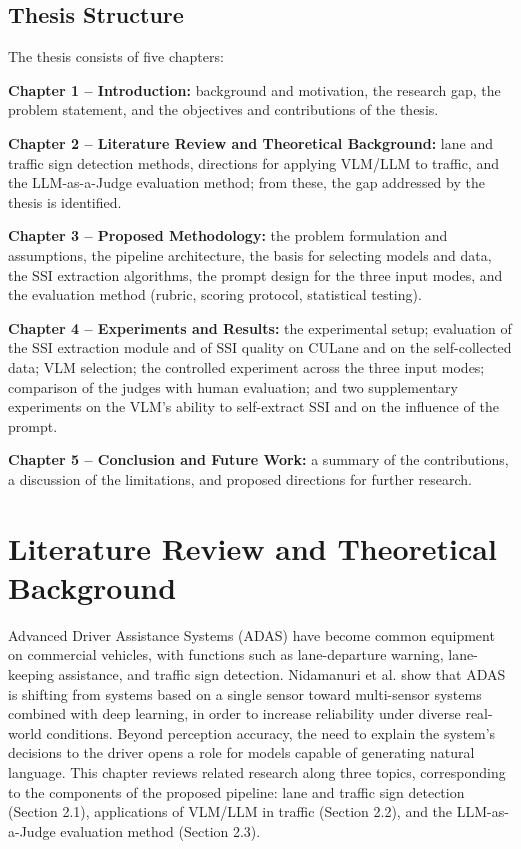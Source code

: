 \documentclass[12pt,a4paper]{report}
\begin{document}
\section{Thesis Structure}

The thesis consists of five chapters:

\textbf{Chapter 1 -- Introduction:} background and motivation, the research gap, the problem statement, and the objectives and contributions of the thesis.

\textbf{Chapter 2 -- Literature Review and Theoretical Background:} lane and traffic sign detection methods, directions for applying VLM/LLM to traffic, and the LLM-as-a-Judge evaluation method; from these, the gap addressed by the thesis is identified.

\textbf{Chapter 3 -- Proposed Methodology:} the problem formulation and assumptions, the pipeline architecture, the basis for selecting models and data, the SSI extraction algorithms, the prompt design for the three input modes, and the evaluation method (rubric, scoring protocol, statistical testing).

\textbf{Chapter 4 -- Experiments and Results:} the experimental setup; evaluation of the SSI extraction module and of SSI quality on CULane and on the self-collected data; VLM selection; the controlled experiment across the three input modes; comparison of the judges with human evaluation; and two supplementary experiments on the VLM's ability to self-extract SSI and on the influence of the prompt.

\textbf{Chapter 5 -- Conclusion and Future Work:} a summary of the contributions, a discussion of the limitations, and proposed directions for further research.

\chapter{Literature Review and Theoretical Background}

Advanced Driver Assistance Systems (ADAS) have become common equipment on commercial vehicles, with functions such as lane-departure warning, lane-keeping assistance, and traffic sign detection. Nidamanuri et al. \cite{nidamanuri2022adas} show that ADAS is shifting from systems based on a single sensor toward multi-sensor systems combined with deep learning, in order to increase reliability under diverse real-world conditions. Beyond perception accuracy, the need to explain the system's decisions to the driver opens a role for models capable of generating natural language. This chapter reviews related research along three topics, corresponding to the components of the proposed pipeline: lane and traffic sign detection (Section 2.1), applications of VLM/LLM in traffic (Section 2.2), and the LLM-as-a-Judge evaluation method (Section 2.3).
\end{document}
